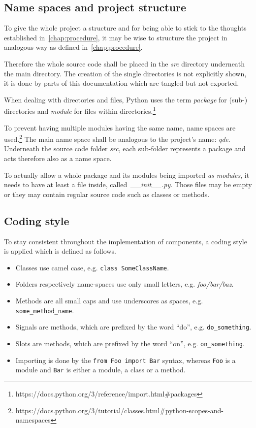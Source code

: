 \documentclass[
    a4paper,      %
    10pt,         %
    openright,    %
    notitlepage,  %
    parskip=half, %
]{scrreprt}       %
\theoremstyle{definition}                    %
\begin{document}
\subsection{Name spaces and project structure}
\label{subsec:appendix-name-spaces}

To give the whole project a structure and for being able to stick to the
thoughts established in~\autoref{chap:procedure}, it may be wise to structure
the project in analogous way as defined in~\autoref{chap:procedure}.

Therefore the whole source code shall be placed in the \textit{src} directory
underneath the main directory. The creation of the single directories is not
explicitly shown, it is done by parts of this documentation which are tangled
but not exported.

When dealing with directories and files, Python uses the term \textit{package} for
(sub-) directories and \textit{module} for files within
directories.\footnote{https://docs.python.org/3/reference/import.html\#packages}

To prevent having multiple modules having the same name, name spaces are
used.\footnote{https://docs.python.org/3/tutorial/classes.html\#python-scopes-and-namespaces}
The main name space shall be analogous to the project's name: \textit{qde}. Underneath
the source code folder \textit{src}, each sub-folder represents a package and acts
therefore also as a name space.

To actually allow a whole package and its modules being imported \textit{as modules},
it needs to have at least a file inside, called~\textit{\_\_init\_\_.py}. Those files may be
empty or they may contain regular source code such as classes or methods.

\subsection{Coding style}
\label{subsec:appendix-implementation-coding-style}

To stay consistent throughout the implementation of components, a coding style
is applied which is defined as follows.

\begin{itemize}
\item Classes use camel case, e.g. \verb+class SomeClassName+.
\item Folders respectively name-spaces use only small letters, e.g.
  \textit{foo/bar/baz}.
\item Methods are all small caps and use underscores as spaces, e.g. \verb+some_method_name+.
\item Signals are methods, which are prefixed by the word \enquote{do}, e.g. \verb+do_something+.
\item Slots are methods, which are prefixed by the word \enquote{on}, e.g. \verb+on_something+.
\item Importing is done by the \verb+from Foo import Bar+ syntax, whereas
  \verb+Foo+ is a module and \verb+Bar+ is either a module, a class or a method.
\end{itemize}
\end{document}
